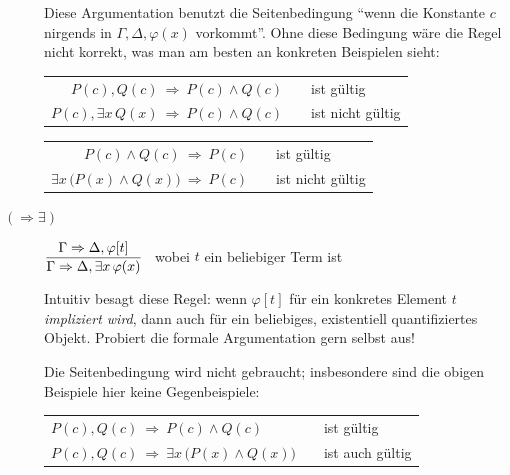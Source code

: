\documentclass[fontsize=11pt, twoside=false, numbers=autoenddot]{scrbook}
\begin{document}
\begin{description}
    \par\smallskip
    Diese Argumentation benutzt die Seitenbedingung "`wenn die Konstante $c$ nirgends in $\Gamma,\Delta,\varphi(x)$ vorkommt"'.
    Ohne diese Bedingung wäre die Regel nicht korrekt, was man am besten an konkreten Beispielen sieht:
    \par\medskip
    \begin{center}
      \begin{tabular}{r@{~}c@{\qquad}l@{}}
        $P(c), Q(c) ~\Rightarrow~ P(c) \land Q(c)$            & & ist gültig \\[2pt]\cline{1-1}
        \rule{0pt}{12pt}%
        $P(c), \exists x\,Q(x) ~\Rightarrow~ P(c) \land Q(c)$ & & ist nicht gültig
      \end{tabular}
    \end{center}
    \par\medskip
    \begin{center}
      \begin{tabular}{r@{~}c@{\qquad}l@{}}
        $P(c) \land Q(c) ~\Rightarrow~ P(c)$                      & & ist gültig \\[2pt]\cline{1-1}
        \rule{0pt}{12pt}%
        $\exists x\,\big(P(x) \land Q(x)\big) ~\Rightarrow~ P(c)$ & & ist nicht gültig
      \end{tabular}
    \end{center}
    \par\bigskip
  \item[{\boldmath $(\Rightarrow\exists)$}]
    $
      \displaystyle
      \frac{\Gamma \Rightarrow \Delta,\varphi[t]}{\Gamma \Rightarrow \Delta, \exists x \, \varphi(x)}
    $
    ~wobei $t$ ein beliebiger Term ist
    ~\par\medskip
    Intuitiv besagt diese Regel: wenn $\varphi[t]$ für ein konkretes Element $t$ \emph{impliziert wird},
    dann auch für ein beliebiges, existentiell quantifiziertes Objekt.
    Probiert die formale Argumentation gern selbst aus!
    \par\medskip
    Die Seitenbedingung wird nicht gebraucht;
    insbesondere sind die obigen Beispiele hier keine Gegenbeispiele:
    \begin{center}
      \begin{tabular}{l@{~}c@{\qquad}l@{}}
        $P(c), Q(c) ~\Rightarrow~ P(c) \land Q(c)$            & & ist gültig \\[2pt]\cline{1-1}
        \rule{0pt}{12pt}%
        $P(c), Q(c) ~\Rightarrow~ \exists x\,\big(P(x) \land Q(x)\big)$ & & ist auch gültig
      \end{tabular}

\end{center}
\end{description}
\end{document}
